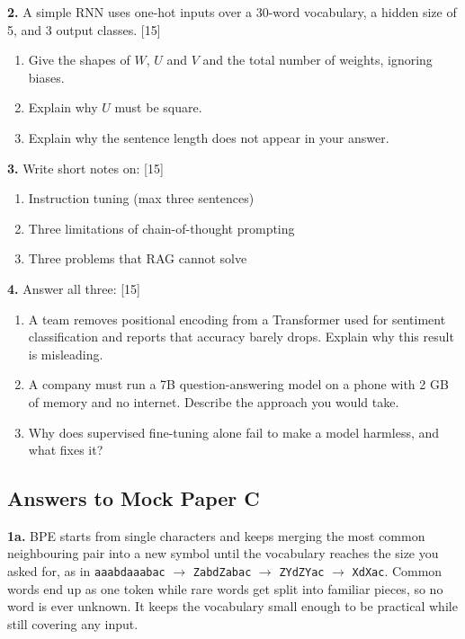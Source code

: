 \documentclass[11pt]{article}
\begin{document}
\textbf{2.} A simple RNN uses one-hot inputs over a 30-word vocabulary, a hidden size of 5, and
3 output classes. \hfill [15]
\begin{enumerate}[label=\alph*.]
  \item Give the shapes of $W$, $U$ and $V$ and the total number of weights, ignoring biases.
  \item Explain why $U$ must be square.
  \item Explain why the sentence length does not appear in your answer.
\end{enumerate}

\textbf{3.} Write short notes on: \hfill [15]
\begin{enumerate}[label=\alph*.]
  \item Instruction tuning (max three sentences)
  \item Three limitations of chain-of-thought prompting
  \item Three problems that RAG cannot solve
\end{enumerate}

\textbf{4.} Answer all three: \hfill [15]
\begin{enumerate}[label=\alph*.]
  \item A team removes positional encoding from a Transformer used for sentiment classification and reports that accuracy barely drops. Explain why this result is misleading.
  \item A company must run a 7B question-answering model on a phone with 2 GB of memory and no internet. Describe the approach you would take.
  \item Why does supervised fine-tuning alone fail to make a model harmless, and what fixes it?
\end{enumerate}

\subsection*{Answers to Mock Paper C}

\textbf{1a.} BPE starts from single characters and keeps merging the most common neighbouring
pair into a new symbol until the vocabulary reaches the size you asked for, as in
\texttt{aaabdaaabac} $\rightarrow$ \texttt{ZabdZabac} $\rightarrow$ \texttt{ZYdZYac}
$\rightarrow$ \texttt{XdXac}. Common words end up as one token while rare words get split into
familiar pieces, so no word is ever unknown. It keeps the vocabulary small enough to be
practical while still covering any input.
\end{document}
